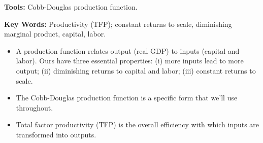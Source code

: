 \textbf{Tools:} Cobb-Douglas production function.

\textbf{Key Words:} Productivity (TFP); constant returns to scale, diminishing marginal product, capital, labor.

\vspace{-0.1in}
\begin{itemize}
    \item A production function relates output (real GDP) to inputs (capital and labor). Ours have three essential properties: (i) more inputs lead to more output; (ii) diminishing returns to capital and labor; (iii) constant returns to scale.
    \item The Cobb-Douglas production function is a specific form that we'll use throughout.
    \item Total factor productivity (TFP) is the overall efficiency with which inputs are transformed into outputs.
\end{itemize}
